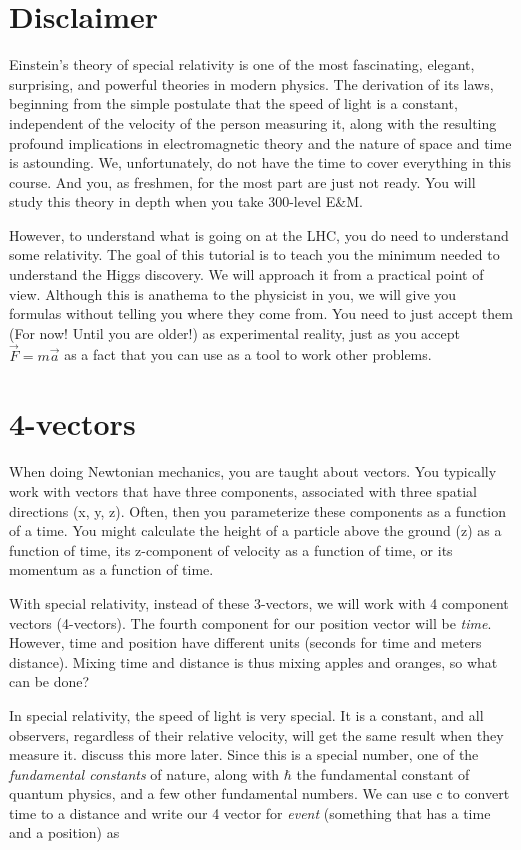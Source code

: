  
\section{Disclaimer}

Einstein's theory of special relativity is one of the most fascinating, elegant, surprising, and powerful theories in modern physics.  The derivation of its laws, beginning from the simple postulate that the speed of light is a constant, independent of the velocity of the person measuring it, along with the resulting profound implications in electromagnetic theory and the nature of space and time is astounding. We, unfortunately, do not have the time to cover everything in this course.  And you, as freshmen, for the most part are just not ready.  You will study this theory in depth when you take 300-level E\&M.

However, to understand what is going on at the LHC, you do need to understand some relativity.  The goal of this tutorial is to teach you the minimum needed to understand the Higgs discovery.  We will approach it from a practical point of view. Although this is anathema to the physicist in you, we will give you formulas without telling you where they come from.  You need to just accept them (For now!  Until you are older!) as experimental reality, just as you accept $\vec{F}=m\vec{a}$  as a fact that you can use as a tool to work other problems.

\section{4-vectors}

When doing Newtonian mechanics, you are taught about vectors.  You typically work with vectors that have three components, associated with three spatial directions (x, y, z).  Often, then you parameterize these components as a function of a time.  You might calculate the height of a particle above the ground (z) as a function of time, its z-component of velocity as a function of time, or its momentum as a function of time.

With special relativity, instead of these 3-vectors, we will work with 4 component vectors (4-vectors).  The fourth component for our position vector will be {\it time}.  However, time and position have different units (seconds for time and meters distance).  Mixing time and distance is thus mixing apples and oranges, so what can be done?

In special relativity, the speed of light is very special.  It is a constant, and all observers, regardless of their relative velocity, will get the same result when they measure it.   discuss this more later.  Since this is a special number, one of the {\it fundamental constants} of nature, along with  $\hbar$ the fundamental constant of quantum physics, and a few other fundamental numbers.  We can use c to convert time to a distance and write our 4 vector for {\it event} (something that has a time and a position) as

